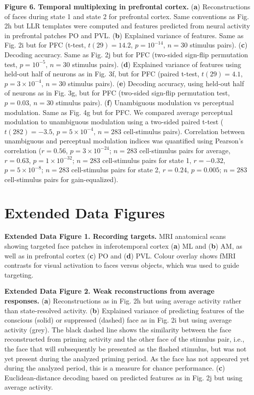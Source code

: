 \documentclass{article}
\begin{document}
\noindent\textbf{Figure 6. Temporal multiplexing in prefrontal cortex.} (\textbf{a}) Reconstructions of faces during state 1 and state 2 for prefrontal cortex. Same conventions as Fig. 2h but LLR templates were computed and features predicted from neural activity in prefrontal patches PO and PVL. (\textbf{b}) Explained variance of features. Same as Fig. 2i but for PFC (t-test, $t(29) = 14.2$, $p = 10^{-14}$, $n = 30$ stimulus pairs). (\textbf{c}) Decoding accuracy. Same as Fig. 2j but for PFC (two-sided sign-flip permutation test, $p = 10^{-5}$, $n = 30$ stimulus pairs). (\textbf{d}) Explained variance of features using held-out half of neurons as in Fig. 3f, but for PFC (paired t-test, $t(29) = 4.1$, $p = 3 \times 10^{-4}$, $n = 30$ stimulus pairs). (\textbf{e}) Decoding accuracy, using held-out half of neurons as in Fig. 3g, but for PFC (two-sided sign-flip permutation test, $p = 0.03$, $n = 30$ stimulus pairs). (\textbf{f}) Unambiguous modulation vs perceptual modulation. Same as Fig. 4g but for PFC. We compared average perceptual modulation to unambiguous modulation using a two-sided paired t-test ($t(282) = -3.5$, $p = 5 \times 10^{-4}$, $n = 283$ cell-stimulus pairs). Correlation between unambiguous and perceptual modulation indices was quantified using Pearson's correlation ($r = 0.56$, $p = 3 \times 10^{-24}$; $n = 283$ cell-stimulus pairs for average, $r = 0.63$, $p = 1 \times 10^{-32}$; $n = 283$ cell-stimulus pairs for state 1, $r = -0.32$, $p = 5 \times 10^{-8}$; $n = 283$ cell-stimulus pairs for state 2, $r = 0.24$, $p = 0.005$; $n = 283$ cell-stimulus pairs for gain-equalized).


\section*{Extended Data Figures}


\noindent\textbf{Extended Data Figure 1. Recording targets.} MRI anatomical scans showing targeted face patches in inferotemporal cortex (\textbf{a}) ML and (\textbf{b}) AM, as well as in prefrontal cortex (\textbf{c}) PO and (\textbf{d}) PVL. Colour overlay shows fMRI contrasts for visual activation to faces versus objects, which was used to guide targeting.



\noindent\textbf{Extended Data Figure 2. Weak reconstructions from average responses.} (\textbf{a}) Reconstructions as in Fig. 2h but using average activity rather than state-resolved activity. (\textbf{b}) Explained variance of predicting features of the conscious (solid) or suppressed (dashed) face as in Fig. 2i but using average activity (grey). The black dashed line shows the similarity between the face reconstructed from priming activity and the other face of the stimulus pair, i.e., the face that will subsequently be presented as the flashed stimulus, but was not yet present during the analyzed priming period. As the face has not appeared yet during the analyzed period, this is a measure for chance performance. (\textbf{c}) Euclidean-distance decoding based on predicted features as in Fig. 2j but using average activity.
\end{document}
